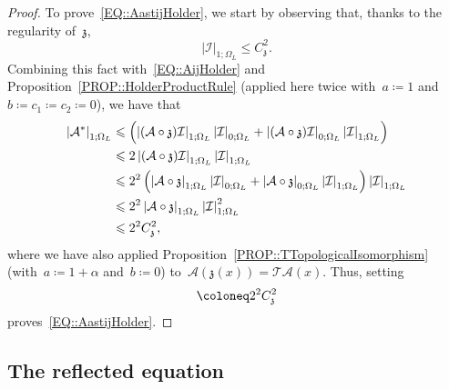 \documentclass[12pt,a4paper]{amsart}
\makeatletter
\numberwithin{equation}{section}
\theoremstyle{definition}
\theoremstyle{remark}
\newcommand{\abs}[1]{\left\lvert#1\right\rvert}
\renewcommand{\leq}{\leqslant}
\newcommand{\const}[1]{%
  \csname const@#1\endcsname%
}
\newcommand{\constapp}[1]{%
  \csname constapp@#1\endcsname%
}
\makeatother
\begin{document}
\begin{proof}
    To prove~\eqref{EQ::AastijHolder}, we start by observing that, thanks to the regularity of~$\mathfrak{z}$,
    \begin{equation}
        \abs{\mathcal{I}}_{1;\Omega_L} \leq C_\mathfrak{z}^2.
    \end{equation}
    Combining this fact with~\eqref{EQ::AijHolder} and Proposition~\ref{PROP::HolderProductRule} (applied here twice with~$a \coloneq 1$ and~$b \coloneq c_1 \coloneq c_2 \coloneq 0$), we have that
    \begin{equation}
        \begin{split}
            \abs{\mathcal{A}^\ast}_{1;\Omega_L} &\leq \constapp{CONST::HolderProductRule} \left(\abs{(\mathcal{A}\circ \mathfrak{z})\mathcal{I}}_{1;\Omega_L}\abs{\mathcal{I}}_{0;\Omega_L} + \abs{(\mathcal{A}\circ \mathfrak{z}) \mathcal{I}}_{0;\Omega_L}\abs{\mathcal{I}}_{1;\Omega_L}\right)\\
                &\leq 2\constapp{CONST::HolderProductRule}\abs{(\mathcal{A}\circ \mathfrak{z}) \mathcal{I}}_{1;\Omega_L}\abs{\mathcal{I}}_{1;\Omega_L}\\
                &\leq 2\constapp{CONST::HolderProductRule}^2 \left(\abs{\mathcal{A}\circ \mathfrak{z}}_{1;\Omega_L}\abs{\mathcal{I}}_{0;\Omega_L} + \abs{\mathcal{A}\circ \mathfrak{z}}_{0;\Omega_L}\abs{\mathcal{I}}_{1;\Omega_L}\right)\abs{\mathcal{I}}_{1;\Omega_L}\\
                &\leq 2\constapp{CONST::HolderProductRule}^2 \abs{\mathcal{A}\circ \mathfrak{z}}_{1;\Omega_L}\abs{\mathcal{I}}_{1;\Omega_L}^2\\
                &\leq 2\constapp{CONST::HolderProductRule}^2 C_\mathfrak{z}^2 \const{CONST::TTopologicalIsomorphismUpper} \const{CONST::AijHolder},
        \end{split}
    \end{equation}
    where we have also applied Proposition~\ref{PROP::TTopologicalIsomorphism} (with~$a \coloneq 1+\alpha$ and~$b \coloneq 0$) to~$\mathcal{A}(\mathfrak{z}(x)) = \mathcal{T}\mathcal{A}(x)$. Thus, setting
    \[\const{CONST::AastijHolder}\coloneq 2\constapp{CONST::HolderProductRule}^2 C_\mathfrak{z}^2 \const{CONST::TTopologicalIsomorphismUpper} \const{CONST::AijHolder}\]
    proves~\eqref{EQ::AastijHolder}.
\end{proof}

\subsection{The reflected equation}\label{SSEC::ReflectedEquation}
\end{document}
